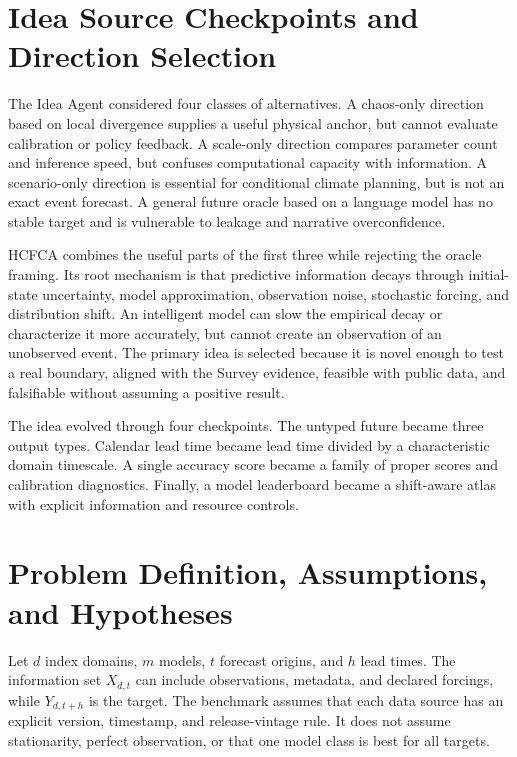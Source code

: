 \documentclass[conference]{IEEEtran}
\begin{document}
\section{Idea Source Checkpoints and Direction Selection}
The Idea Agent considered four classes of alternatives. A chaos-only direction based on local divergence supplies a useful physical anchor, but cannot evaluate calibration or policy feedback. A scale-only direction compares parameter count and inference speed, but confuses computational capacity with information. A scenario-only direction is essential for conditional climate planning, but is not an exact event forecast. A general future oracle based on a language model has no stable target and is vulnerable to leakage and narrative overconfidence.

HCFCA combines the useful parts of the first three while rejecting the oracle framing. Its root mechanism is that predictive information decays through initial-state uncertainty, model approximation, observation noise, stochastic forcing, and distribution shift. An intelligent model can slow the empirical decay or characterize it more accurately, but cannot create an observation of an unobserved event. The primary idea is selected because it is novel enough to test a real boundary, aligned with the Survey evidence, feasible with public data, and falsifiable without assuming a positive result.

The idea evolved through four checkpoints. The untyped future became three output types. Calendar lead time became lead time divided by a characteristic domain timescale. A single accuracy score became a family of proper scores and calibration diagnostics. Finally, a model leaderboard became a shift-aware atlas with explicit information and resource controls.

\section{Problem Definition, Assumptions, and Hypotheses}
Let $d$ index domains, $m$ models, $t$ forecast origins, and $h$ lead times. The information set $X_{d,t}$ can include observations, metadata, and declared forcings, while $Y_{d,t+h}$ is the target. The benchmark assumes that each data source has an explicit version, timestamp, and release-vintage rule. It does not assume stationarity, perfect observation, or that one model class is best for all targets.
\end{document}
